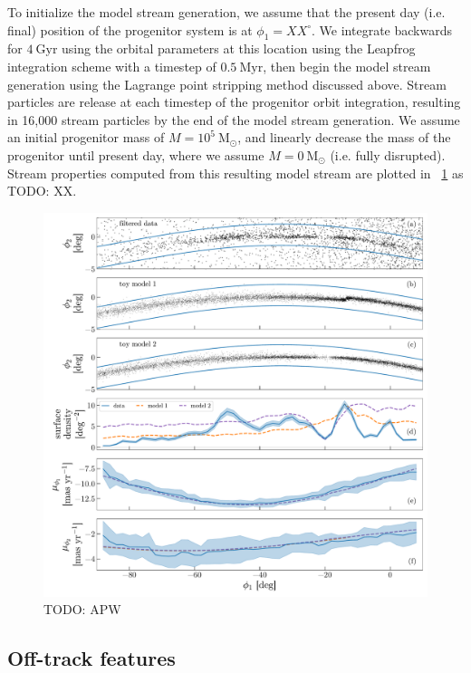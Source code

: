 \documentclass[modern]{aastex62}
\newcommand{\msun}{\textrm{M}_\odot}
\newcommand{\todo}[1]{{\color{red} TODO: #1}}
\begin{document}
To initialize the model stream generation, we assume that the present day (i.e.
final) position of the progenitor system is at $\phi_1 = XX^\circ$.
We integrate backwards for $4~\textrm{Gyr}$ using the orbital parameters at this
location using the Leapfrog integration scheme with a timestep of
$0.5~\textrm{Myr}$, then begin the model stream generation using the Lagrange
point stripping method discussed above.
Stream particles are release at each timestep of the progenitor orbit
integration, resulting in 16,000 stream particles by the end of the model stream
generation.
We assume an initial progenitor mass of $M=10^5~\msun$, and linearly decrease
the mass of the progenitor until present day, where we assume $M = 0~\msun$
(i.e. fully disrupted).
Stream properties computed from this resulting model stream are plotted in
\figurename~\ref{fig:track-and-model} as \todo{XX}.

\begin{figure}[h]
\begin{center}
\includegraphics[width=\textwidth]{track_observables.pdf}
\end{center}
\caption{%
\todo{APW}
\label{fig:track-and-model}
}
\end{figure}


\subsection{Off-track features}
\label{sec:res_gap}
\end{document}
